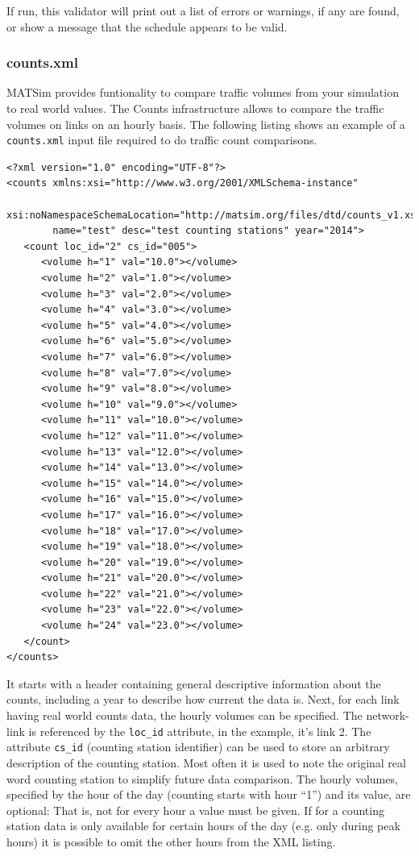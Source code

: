 If run, this validator will print out a list of errors or warnings, if any are found, or show a message that the schedule appears to be valid. 

\subsubsection{counts.xml}
MATSim provides funtionality to compare traffic volumes from your simulation to real world values. The Counts infrastructure allows to compare the traffic volumes on links on an hourly basis. The following listing shows an example of a \lstinline|counts.xml| input file required to do traffic count comparisons. 

\begin{lstlisting}
<?xml version="1.0" encoding="UTF-8"?> 
<counts xmlns:xsi="http://www.w3.org/2001/XMLSchema-instance" 
        xsi:noNamespaceSchemaLocation="http://matsim.org/files/dtd/counts_v1.xsd" 
        name="test" desc="test counting stations" year="2014"> 
   <count loc_id="2" cs_id="005"> 
      <volume h="1" val="10.0"></volume> 
      <volume h="2" val="1.0"></volume> 
      <volume h="3" val="2.0"></volume> 
      <volume h="4" val="3.0"></volume> 
      <volume h="5" val="4.0"></volume> 
      <volume h="6" val="5.0"></volume> 
      <volume h="7" val="6.0"></volume> 
      <volume h="8" val="7.0"></volume> 
      <volume h="9" val="8.0"></volume> 
      <volume h="10" val="9.0"></volume> 
      <volume h="11" val="10.0"></volume> 
      <volume h="12" val="11.0"></volume> 
      <volume h="13" val="12.0"></volume> 
      <volume h="14" val="13.0"></volume> 
      <volume h="15" val="14.0"></volume> 
      <volume h="16" val="15.0"></volume> 
      <volume h="17" val="16.0"></volume> 
      <volume h="18" val="17.0"></volume> 
      <volume h="19" val="18.0"></volume> 
      <volume h="20" val="19.0"></volume> 
      <volume h="21" val="20.0"></volume> 
      <volume h="22" val="21.0"></volume> 
      <volume h="23" val="22.0"></volume> 
      <volume h="24" val="23.0"></volume> 
   </count> 
</counts>
\end{lstlisting}

It starts with a header containing general descriptive information about the counts, including a year to describe how current the data is. Next, for each link having real world counts data, the hourly volumes can be specified. The network-link is referenced by the \lstinline|loc_id| attribute, in the example, it's link 2. The attribute \lstinline|cs_id| (counting station identifier) can be used to store an arbitrary description of the counting station. Most often it is used to note the original real word counting station to simplify future data comparison. The hourly volumes, specified by the hour of the day (counting starts with hour ``1'') and its value, are optional: That is, not for every hour a value must be given. If for a counting station data is only available for certain hours of the day (e.g. only during peak hours) it is possible to omit the other hours from the XML listing. 

